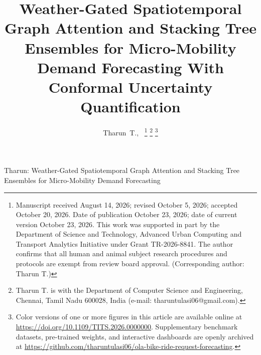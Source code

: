 \documentclass[10pt,journal,compsoc]{IEEEtran}
\begin{document}
\title{Weather-Gated Spatiotemporal Graph Attention and Stacking Tree Ensembles for Micro-Mobility Demand Forecasting With Conformal Uncertainty Quantification}

\author{Tharun~T.,~
\thanks{Manuscript received August 14, 2026; revised October 5, 2026; accepted October 20, 2026. Date of publication October 23, 2026; date of current version October 23, 2026. This work was supported in part by the Department of Science and Technology, Advanced Urban Computing and Transport Analytics Initiative under Grant TR-2026-8841. The author confirms that all human and animal subject research procedures and protocols are exempt from review board approval. (Corresponding author: Tharun T.)}
\thanks{Tharun T. is with the Department of Computer Science and Engineering, Chennai, Tamil Nadu 600028, India (e-mail: tharuntulasi06@gmail.com).}%
\thanks{Color versions of one or more figures in this article are available online at \url{https://doi.org/10.1109/TITS.2026.0000000}. Supplementary benchmark datasets, pre-trained weights, and interactive dashboards are openly archived at \url{https://github.com/tharuntulasi06/ola-bike-ride-request-forecasting}.}
}

%
{Tharun: Weather-Gated Spatiotemporal Graph Attention and Stacking Tree Ensembles for Micro-Mobility Demand Forecasting}
\end{document}
